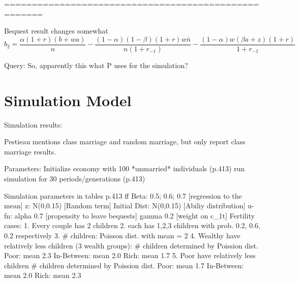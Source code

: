 \documentclass{article}
\begin{document}
=====================================================

Bequest result changes somewhat
\begin{equation}
b_{2} =
\frac{\alpha(1+r)(b+wa)}{n}
- \frac{(1-\alpha)(1-\beta)(1+r)w\bar{n}}{n(1+r_{-1})}
- \frac{(1-\alpha)w(\beta a + z)(1+r)}{1+r_{-1}}
\label{Pestieau11p} \tag{Pestieau 11'}
\end{equation}

Query: So, apparently this what P uses for the simulation?



\section{Simulation Model}

Simulation results:

Pestieau mentions class marriage and random marriage,
but only report class marriage results.

\begin{verbatimtab}
Parameters:
	Initialize economy with 100 *unmarried* individuals (p.413)
	run simulation for 30 periods/generations (p.413)

Simulation parameters in tables p.413 ff
	Beta:			0.5; 0.6; 0.7	[regression to the mean]
	z: 				N(0,0.15)		[Random term]
	Initial Dist:	N(0,0.15)		[Abiliy distribution]
	u-fn:	alpha	0.7				[propensity to leave bequests]
			gamma	0.2				[weight on c_1t]
	Fertility cases:
		1. Every couple has 2 children
		2. each has 1,2,3 children with prob. 0.2, 0.6, 0.2 respectively
		3. # children: Poisson dist. with mean = 2
		4. Wealthy have relatively less children (3 wealth groups):
			# children determined by Poission dist.
			Poor: 		mean 2.3
			In-Between: mean 2.0
			Rich:		mean 1.7
		5. Poor have relatively less children
			# children determined by Poission dist.
			Poor:		mean 1.7
			In-Between:	mean 2.0
			Rich:		mean 2.3
\end{verbatimtab}
\end{document}
